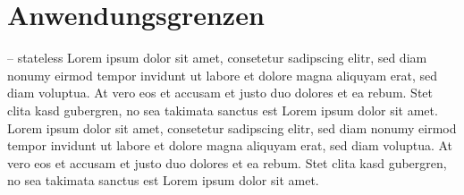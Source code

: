 \section{Anwendungsgrenzen}
-- stateless
Lorem ipsum dolor sit amet, consetetur sadipscing elitr,
sed diam nonumy eirmod tempor invidunt ut labore et dolore magna
aliquyam erat, sed diam voluptua.
At vero eos et accusam et justo duo dolores et ea rebum. Stet clita kasd gubergren,
no sea takimata sanctus est Lorem ipsum dolor sit amet. Lorem ipsum dolor sit amet,
consetetur sadipscing elitr, sed diam nonumy eirmod tempor invidunt ut labore et
dolore magna aliquyam erat, sed diam voluptua.
At vero eos et accusam et justo duo dolores et ea rebum.
Stet clita kasd gubergren, no sea takimata sanctus est Lorem ipsum dolor sit amet.